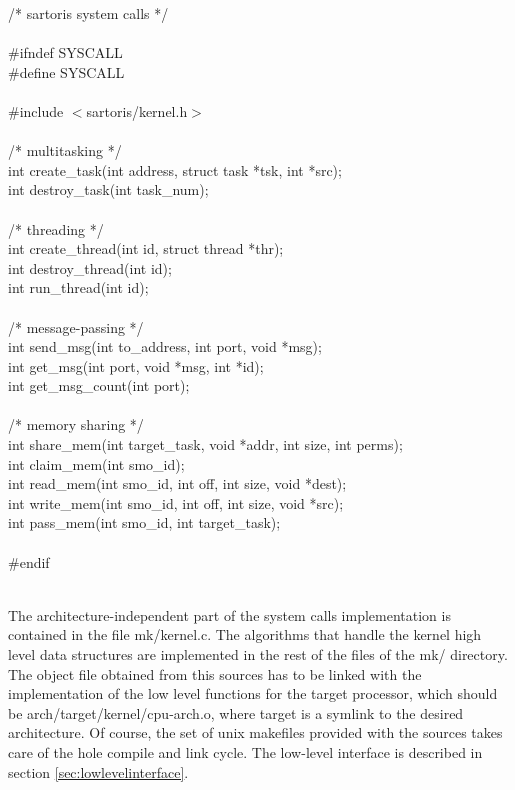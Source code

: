 \documentclass[11pt, letterpaper, twoside, english]{book}
\begin{document}
\begin{sf}
\noindent /* sartoris system calls */ \\
\\
\#ifndef SYSCALL \\ 
\#define SYSCALL \\
\\
\#include $<$sartoris/kernel.h$>$ \\
\\
/* multitasking */ \\
int create\_task(int address, struct task *tsk, int *src); \\
int destroy\_task(int task\_num); \\
\\
/* threading */ \\
int create\_thread(int id, struct thread *thr); \\
int destroy\_thread(int id); \\
int run\_thread(int id); \\
\\
/* message-passing */ \\
int send\_msg(int to\_address, int port, void *msg); \\
int get\_msg(int port, void *msg, int *id); \\
int get\_msg\_count(int port); \\
\\
/* memory sharing */ \\
int share\_mem(int target\_task, void *addr, int size, int perms); \\
int claim\_mem(int smo\_id); \\
int read\_mem(int smo\_id, int off, int size, void *dest); \\
int write\_mem(int smo\_id, int off, int size, void *src); \\ 
int pass\_mem(int smo\_id, int target\_task); \\
\\
\#endif \\ \\
\end{sf}
The architecture-independent part of the system calls implementation is contained in the file \textsf{mk/kernel.c}. The algorithms that handle the kernel high level data structures are implemented in the rest of the files of the \textsf{mk/} directory. The object file obtained from this sources has to be linked with the implementation of the low level functions for the target processor, which should be  \textsf{arch/target/kernel/cpu-arch.o}, where \textsf{target} is a symlink to the desired architecture. Of course, the set of unix makefiles provided with the sources takes care of the hole compile and link cycle.  The low-level interface is described in section \ref{sec:lowlevelinterface}. 
\end{document}
